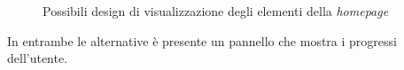 \begin{figure} [h]
    \centering
    \caption{Possibili design di visualizzazione degli elementi della \textit{homepage}}
    \label{fig:homepages}
\end{figure}

In entrambe le alternative è presente un pannello che mostra i progressi dell'utente.

